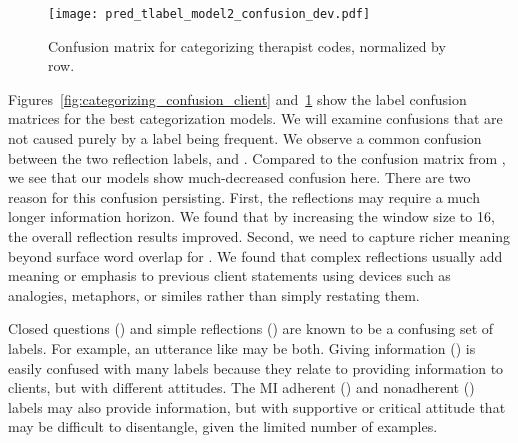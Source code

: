 \begin{figure}[!tbp]
\begin{center}
  \texttt{[image: pred\_tlabel\_model2\_confusion\_dev.pdf]}
\end{center}
  \caption{\label{fig:categorizing_confusion_therapist} Confusion matrix for categorizing therapist codes, normalized by row.}
\end{figure}

Figures~\ref{fig:categorizing_confusion_client} and~\ref{fig:categorizing_confusion_therapist} show the
label confusion matrices for the best categorization models. We will
examine confusions that are not caused purely by a label being
frequent. We observe a common confusion between
the two reflection labels, \REC and \RES. Compared to the
confusion matrix from \citet{xiao2016behavioral}, we see that our
models show much-decreased confusion here. There are two reason for
this confusion persisting. First, the reflections may require a much
longer information horizon. We found that by increasing the window
size to 16, the overall reflection results improved. Second, we need
to capture richer meaning beyond surface word overlap for
\RES. We found that
complex reflections usually add meaning or emphasis  to
previous client statements using devices such as analogies,
metaphors, or similes rather than simply restating them. %

%
Closed questions (\QUC) and simple reflections (\RES) are known to
be a confusing set of labels. For example, an utterance like
 may be both.
%
Giving information (\GI)
is easily confused with many labels because they relate to providing
information to clients, but with different attitudes. The MI adherent
(\MIA) and nonadherent (\MIN) labels may also provide information,
but with supportive or critical attitude that may be difficult to
disentangle, given the limited number of examples.



